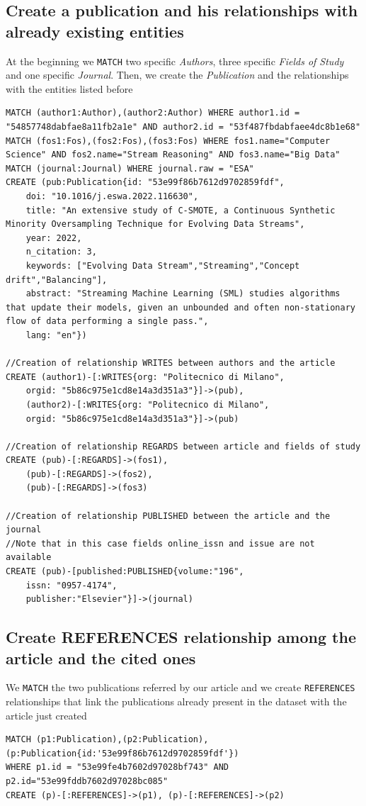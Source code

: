 \documentclass{Configuration_Files/PoliMi3i_thesis}
\begin{document}
\subsection{Create a publication and his relationships with already existing entities}
At the beginning we \verb |MATCH| two specific \emph{Authors}, three specific \emph{Fields of Study} and one specific
\emph{Journal}. Then, we create the \emph{Publication} and the relationships with the entities listed before
\begin{lstlisting}[language=cypher, label=lst:cypher-example]
MATCH (author1:Author),(author2:Author) WHERE author1.id = "54857748dabfae8a11fb2a1e" AND author2.id = "53f487fbdabfaee4dc8b1e68"
MATCH (fos1:Fos),(fos2:Fos),(fos3:Fos) WHERE fos1.name="Computer Science" AND fos2.name="Stream Reasoning" AND fos3.name="Big Data"
MATCH (journal:Journal) WHERE journal.raw = "ESA"
CREATE (pub:Publication{id: "53e99f86b7612d9702859fdf",
    doi: "10.1016/j.eswa.2022.116630",
    title: "An extensive study of C-SMOTE, a Continuous Synthetic Minority Oversampling Technique for Evolving Data Streams",
    year: 2022,
    n_citation: 3,
    keywords: ["Evolving Data Stream","Streaming","Concept drift","Balancing"],
    abstract: "Streaming Machine Learning (SML) studies algorithms that update their models, given an unbounded and often non-stationary flow of data performing a single pass.",
    lang: "en"})

//Creation of relationship WRITES between authors and the article
CREATE (author1)-[:WRITES{org: "Politecnico di Milano",
    orgid: "5b86c975e1cd8e14a3d351a3"}]->(pub),
    (author2)-[:WRITES{org: "Politecnico di Milano",
    orgid: "5b86c975e1cd8e14a3d351a3"}]->(pub)

//Creation of relationship REGARDS between article and fields of study
CREATE (pub)-[:REGARDS]->(fos1),
    (pub)-[:REGARDS]->(fos2),
    (pub)-[:REGARDS]->(fos3)

//Creation of relationship PUBLISHED between the article and the journal
//Note that in this case fields online_issn and issue are not available
CREATE (pub)-[published:PUBLISHED{volume:"196",
    issn: "0957-4174",
    publisher:"Elsevier"}]->(journal)
\end{lstlisting}

\subsection{Create REFERENCES relationship among the article and the cited ones}
We \verb |MATCH| the two publications referred by our article and we create \verb |REFERENCES| relationships that link
the publications already present in the dataset with the article just created
\begin{lstlisting}[language=cypher, label=lst:cypher-example]
MATCH (p1:Publication),(p2:Publication),(p:Publication{id:'53e99f86b7612d9702859fdf'})
WHERE p1.id = "53e99fe4b7602d97028bf743" AND p2.id="53e99fddb7602d97028bc085"
CREATE (p)-[:REFERENCES]->(p1), (p)-[:REFERENCES]->(p2)
\end{lstlisting}
\end{document}
